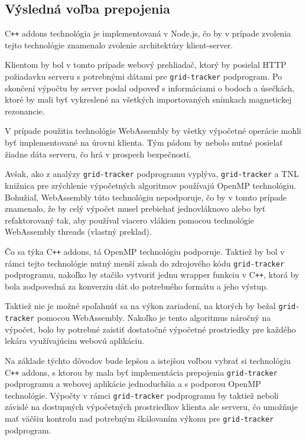 \subsection {Výsledná voľba prepojenia}
C\texttt{++} addons technológia je implementovaná v Node.js, čo by v prípade zvolenia tejto technológie znamenalo zvolenie architektúry klient-server.

Klientom by bol v tomto prípade webový prehliadač, ktorý by posielal HTTP požiadavku serveru s potrebnými dátami pre \texttt{grid-tracker} podprogram. Po skončení výpočtu by server poslal odpoveď s informáciami o bodoch a úsečkách, ktoré by mali byť vykreslené na všetkých importovaných snímkach magnetickej rezonancie.

V prípade použitia technológie WebAssembly by všetky výpočetné operácie mohli byť implementované na úrovni klienta. Tým pádom by nebolo nutné posielať žiadne dáta serveru, čo hrá v prospech bezpečnosti.

Avšak, ako z analýzy \texttt{grid-tracker} podprogramu vyplýva, \texttt{grid-tracker} a TNL knižnica pre zrýchlenie výpočetných algoritmov používajú OpenMP technológiu. Bohužiaľ, WebAssembly túto technológiu nepodporuje, čo by v tomto prípade znamenalo, že by celý výpočet musel prebiehať jednovláknovo alebo byť refaktorovaný tak, aby používal viacero vlákien pomocou technológie WebAssembly threads \cite{webassembly_threads} (vlastný preklad).

Čo sa týka C\texttt{++} addons, tá OpenMP technológiu podporuje. Taktiež by bol v rámci tejto technológie nutný menší zásah do zdrojového kódu \newline \texttt{grid-tracker} podprogramu, nakoľko by stačilo vytvoriť jednu wrapper funkciu v C\texttt{++}, ktorá by bola zodpovedná za konverziu dát do potrebného formátu a jeho výstup.

Taktiež nie je možné spoľahnúť sa na výkon zariadení, na ktorých by bežal \texttt{grid-tracker} pomocou WebAssembly. Nakoľko je tento algoritmus náročný na výpočet, bolo by potrebné zaistiť dostatočné výpočetné prostriedky pre každého lekára využívajúcim webovú aplikáciu.

Na základe týchto dôvodov bude lepšou a istejšou voľbou vybrať si technológiu C\texttt{++} addons, s ktorou by mala byť implementácia prepojenia \texttt{grid-tracker} podprogramu a webovej aplikácie jednoduchšia a s podporou OpenMP technológie. Výpočty v rámci \texttt{grid-tracker} podprogramu by taktiež neboli závislé na dostupných výpočetných prostriedkov klienta ale serveru, čo umožňuje mať väčšiu kontrolu nad potrebným škálovaním výkonu pre \texttt{grid-tracker} podprogram.

